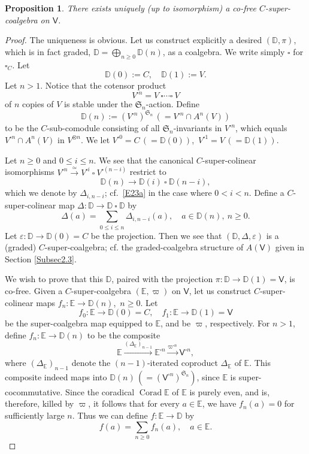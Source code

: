 \documentclass[11pt, a4paper]{amsart}
\newtheorem{prop}[theorem]{Proposition}
\theoremstyle{definition}
\numberwithin{equation}{section}
\begin{document}
\begin{prop}\label{P31}
There exists uniquely (up to isomorphism) a co-free $C$-super-coalgebra on $\mathsf{V}$.
\end{prop}
\begin{proof}
The uniqueness is obvious.
Let us construct explicitly a desired $(\mathbb{D}, \pi)$, which is in fact graded, $\mathbb{D}= \bigoplus_{n \geq 0} \mathbb{D}(n)$, as a coalgebra. We write simply $\square$ for $\square_{C}$.
Let
\[ \mathbb{D}(0):=C,\quad \mathbb{D}(1):=V. \]
Let $n >1$.
Notice that the cotensor product
\[ V^{\square n} = V~\square \cdots \square~V \]
of $n$ copies of $V$ is stable under the $\mathfrak{S}_{n}$-action.
Define
\[ \mathbb{D}(n):= (V^{\square n})^{\mathfrak{S}_{n}}\, (= V^{\square n} \cap A^{n}(V)) \]
to be the $C$-sub-comodule consisting of all $\mathfrak{S}_{n}$-invariants in $V^{\square n}$, which equals $V^{\square n} \cap A^{n}(V)$ in $V^{\otimes n}$.
We let $V^{\square 0} = C\, (=\mathbb{D}(0))$,\ $V^{\square 1}=V\, (= \mathbb{D}(1))$.

Let $n \geq 0$ and $0 \leq i \leq n$.
We see that the canonical $C$-super-colinear isomorphisms $V^{\square n} \overset{\simeq}{\longrightarrow} 
V^{\square i}~\square~V^{\square (n-i)}$ restrict to
\[ \mathbb{D}(n) \to \mathbb{D}(i)~\square~\mathbb{D}(n-i), \]
which we denote by $\Delta_{i, n-i}$; cf.~\eqref{E23a} in the case where $0 < i < n$.
Define a $C$-super-colinear map $\Delta: \mathbb{D} \to \mathbb{D}~\square~\mathbb{D}$ by
\[ \Delta(a) = \sum_{0 \leq i \leq n} \Delta_{i, n-i}(a),\quad a \in \mathbb{D}(n),\ n \geq 0. \]
Let $\varepsilon: \mathbb{D} \to \mathbb{D}(0)=C$ be the projection.
Then we see that $(\mathbb{D}, \Delta, \varepsilon)$ is a (graded) $C$-super-coalgebra; cf. the graded-coalgebra structure of $A(\mathsf{V})$ given in Section \ref{Subsec2.3}.

We wish to prove that this $\mathbb{D}$, paired with the projection $\pi: \mathbb{D} \to \mathbb{D}(1) = \mathsf{V}$, 
is co-free.
Given a $C$-super-coalgebra $(\mathbb{E}, \varpi)$ on $\mathsf{V}$, let us construct $C$-super-colinear maps $f_{n}: \mathbb{E} \to \mathbb{D}(n)$,\ $n \geq 0$.
Let
\[ f_{0}: \mathbb{E} \to \mathbb{D}(0) = C,\quad f_{1}: \mathbb{E} \to \mathbb{D}(1) = \mathsf{V} \]
be the super-coalgebra map equipped to $\mathbb{E}$, and be $\varpi$, respectively.
For $n>1$, define $f_{n}: \mathbb{E} \to \mathbb{D}(n)$ to be the composite
\begin{equation}\label{E32}
\mathbb{E} \xrightarrow{(\Delta_{\mathbb{E}})_{n-1}} \mathbb{E}^{\square n} \xrightarrow{\varpi^{\square n}} \mathsf{V}^{\square n},
\end{equation}
where $(\Delta_{\mathbb{E}})_{n-1}$ denote the $(n-1)$-iterated coproduct $\Delta_{\mathbb{E}}$ of $\mathbb{E}$.
This composite indeed maps into $\mathbb{D}(n)\, (=(\mathsf{V}^{\square n})^{\mathfrak{S}_{n}})$, since $\mathbb{E}$ is super-cocommutative.
Since the coradical $\operatorname{Corad} \mathbb{E}$ of $\mathbb{E}$ is purely even, and is, therefore, killed by $\varpi$, it follows that for every $a \in \mathbb{E}$, we have $f_{n}(a)=0$ for sufficiently large $n$.
Thus we can define $f: \mathbb{E} \to \mathbb{D}$ by
\[ f(a)=\sum_{n \geq 0} f_{n}(a),\quad a \in \mathbb{E}. \]


\end{proof}
\end{document}
